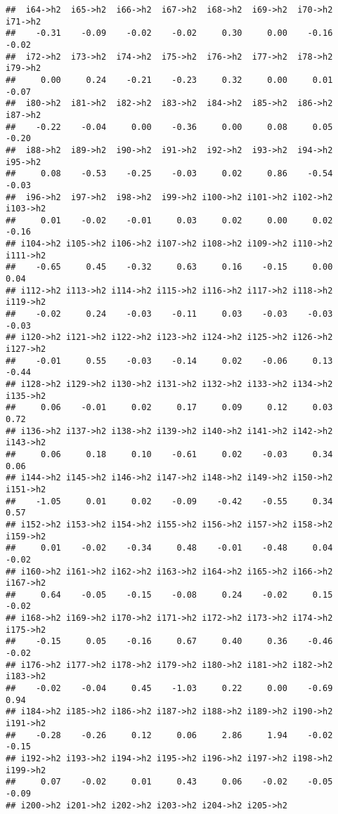 \documentclass[
]{article}
\begin{document}
\begin{verbatim}
##  i64->h2  i65->h2  i66->h2  i67->h2  i68->h2  i69->h2  i70->h2  i71->h2 
##    -0.31    -0.09    -0.02    -0.02     0.30     0.00    -0.16    -0.02 
##  i72->h2  i73->h2  i74->h2  i75->h2  i76->h2  i77->h2  i78->h2  i79->h2 
##     0.00     0.24    -0.21    -0.23     0.32     0.00     0.01    -0.07 
##  i80->h2  i81->h2  i82->h2  i83->h2  i84->h2  i85->h2  i86->h2  i87->h2 
##    -0.22    -0.04     0.00    -0.36     0.00     0.08     0.05    -0.20 
##  i88->h2  i89->h2  i90->h2  i91->h2  i92->h2  i93->h2  i94->h2  i95->h2 
##     0.08    -0.53    -0.25    -0.03     0.02     0.86    -0.54    -0.03 
##  i96->h2  i97->h2  i98->h2  i99->h2 i100->h2 i101->h2 i102->h2 i103->h2 
##     0.01    -0.02    -0.01     0.03     0.02     0.00     0.02    -0.16 
## i104->h2 i105->h2 i106->h2 i107->h2 i108->h2 i109->h2 i110->h2 i111->h2 
##    -0.65     0.45    -0.32     0.63     0.16    -0.15     0.00     0.04 
## i112->h2 i113->h2 i114->h2 i115->h2 i116->h2 i117->h2 i118->h2 i119->h2 
##    -0.02     0.24    -0.03    -0.11     0.03    -0.03    -0.03    -0.03 
## i120->h2 i121->h2 i122->h2 i123->h2 i124->h2 i125->h2 i126->h2 i127->h2 
##    -0.01     0.55    -0.03    -0.14     0.02    -0.06     0.13    -0.44 
## i128->h2 i129->h2 i130->h2 i131->h2 i132->h2 i133->h2 i134->h2 i135->h2 
##     0.06    -0.01     0.02     0.17     0.09     0.12     0.03     0.72 
## i136->h2 i137->h2 i138->h2 i139->h2 i140->h2 i141->h2 i142->h2 i143->h2 
##     0.06     0.18     0.10    -0.61     0.02    -0.03     0.34     0.06 
## i144->h2 i145->h2 i146->h2 i147->h2 i148->h2 i149->h2 i150->h2 i151->h2 
##    -1.05     0.01     0.02    -0.09    -0.42    -0.55     0.34     0.57 
## i152->h2 i153->h2 i154->h2 i155->h2 i156->h2 i157->h2 i158->h2 i159->h2 
##     0.01    -0.02    -0.34     0.48    -0.01    -0.48     0.04    -0.02 
## i160->h2 i161->h2 i162->h2 i163->h2 i164->h2 i165->h2 i166->h2 i167->h2 
##     0.64    -0.05    -0.15    -0.08     0.24    -0.02     0.15    -0.02 
## i168->h2 i169->h2 i170->h2 i171->h2 i172->h2 i173->h2 i174->h2 i175->h2 
##    -0.15     0.05    -0.16     0.67     0.40     0.36    -0.46    -0.02 
## i176->h2 i177->h2 i178->h2 i179->h2 i180->h2 i181->h2 i182->h2 i183->h2 
##    -0.02    -0.04     0.45    -1.03     0.22     0.00    -0.69     0.94 
## i184->h2 i185->h2 i186->h2 i187->h2 i188->h2 i189->h2 i190->h2 i191->h2 
##    -0.28    -0.26     0.12     0.06     2.86     1.94    -0.02    -0.15 
## i192->h2 i193->h2 i194->h2 i195->h2 i196->h2 i197->h2 i198->h2 i199->h2 
##     0.07    -0.02     0.01     0.43     0.06    -0.02    -0.05    -0.09 
## i200->h2 i201->h2 i202->h2 i203->h2 i204->h2 i205->h2 

\end{verbatim}
\end{document}
